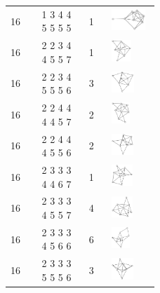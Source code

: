 \begin{footnotesize}
\begin{longtable}{m{0.07\linewidth} m{0.15\linewidth} m{0.05\linewidth} m{0.15\linewidth}}
16 & 1 3 4 4 5 5 5 5 & 1 & \includegraphics[height=0.8cm]{15-universal-graphs/img/degree-sequences-example-graphs/graph-4-8-133}\\
16 & 2 2 3 4 4 5 5 7 & 1 & \includegraphics[height=0.8cm]{15-universal-graphs/img/degree-sequences-example-graphs/graph-4-8-134}\\
16 & 2 2 3 4 5 5 5 6 & 3 & \includegraphics[height=0.8cm]{15-universal-graphs/img/degree-sequences-example-graphs/graph-4-8-135}\\
16 & 2 2 4 4 4 4 5 7 & 2 & \includegraphics[height=0.8cm]{15-universal-graphs/img/degree-sequences-example-graphs/graph-4-8-136}\\
16 & 2 2 4 4 4 5 5 6 & 2 & \includegraphics[height=0.8cm]{15-universal-graphs/img/degree-sequences-example-graphs/graph-4-8-137}\\
16 & 2 3 3 3 4 4 6 7 & 1 & \includegraphics[height=0.8cm]{15-universal-graphs/img/degree-sequences-example-graphs/graph-4-8-138}\\
16 & 2 3 3 3 4 5 5 7 & 4 & \includegraphics[height=0.8cm]{15-universal-graphs/img/degree-sequences-example-graphs/graph-4-8-139}\\
16 & 2 3 3 3 4 5 6 6 & 6 & \includegraphics[height=0.8cm]{15-universal-graphs/img/degree-sequences-example-graphs/graph-4-8-140}\\
16 & 2 3 3 3 5 5 5 6 & 3 & \includegraphics[height=0.8cm]{15-universal-graphs/img/degree-sequences-example-graphs/graph-4-8-141}\\

\end{longtable}
\end{footnotesize}
